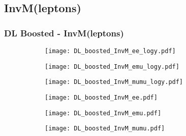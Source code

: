 \documentclass[aspectratio=169,8pt]{beamer}
\begin{document}
\subsection{InvM(leptons)}
\begin{frame}
\frametitle{DL Boosted - InvM(leptons)}
\begin{figure}
\captionsetup[subfigure]{labelformat=empty}
\begin{subfigure}{0.32\textwidth}
\texttt{[image: DL\_boosted\_InvM\_ee\_logy.pdf]}
\vspace*{-0.15cm}
\end{subfigure}
\hfil
\begin{subfigure}{0.32\textwidth}
\texttt{[image: DL\_boosted\_InvM\_emu\_logy.pdf]}
\vspace*{-0.15cm}
\end{subfigure}
\hfil
\begin{subfigure}{0.32\textwidth}
\texttt{[image: DL\_boosted\_InvM\_mumu\_logy.pdf]}
\vspace*{-0.15cm}
\end{subfigure}
\hfil
\begin{subfigure}{0.32\textwidth}
\texttt{[image: DL\_boosted\_InvM\_ee.pdf]}
\vspace*{-0.15cm}
\end{subfigure}
\hfil
\begin{subfigure}{0.32\textwidth}
\texttt{[image: DL\_boosted\_InvM\_emu.pdf]}
\vspace*{-0.15cm}
\end{subfigure}
\hfil
\begin{subfigure}{0.32\textwidth}
\texttt{[image: DL\_boosted\_InvM\_mumu.pdf]}
\vspace*{-0.15cm}
\end{subfigure}
\hfil
\end{figure}
\end{frame}
\newpage
\end{document}
